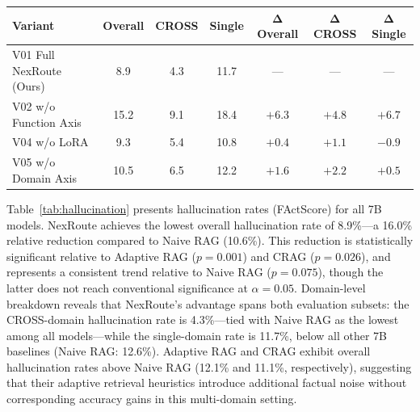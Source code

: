 \documentclass[a4paper,fleql]{cas-sc}
\begin{document}
\vspace{6pt plus 4pt minus 3pt}
\begin{center}
\begingroup
{}
\label{tab:ablation}
\begin{tabular}{lcccccc}
\toprule
\textbf{Variant} & \textbf{Overall} & \textbf{CROSS} & \textbf{Single} & $\boldsymbol{\Delta}$\textbf{Overall} & $\boldsymbol{\Delta}$\textbf{CROSS} & $\boldsymbol{\Delta}$\textbf{Single} \\
\midrule
V01 Full NexRoute (Ours) & 8.9 & 4.3 & 11.7 & --- & --- & --- \\
V02 w/o Function Axis    & 15.2 & 9.1 & 18.4 & $+6.3$ & $+4.8$ & $+6.7$ \\
V04 w/o LoRA        &  9.3 & 5.4 & 10.8 & $+0.4$ & $+1.1$ & $-0.9$ \\
V05 w/o Domain Axis & 10.5 & 6.5 & 12.2 & $+1.6$ & $+2.2$ & $+0.5$ \\
\midrule
\end{tabular}
\endgroup
\end{center}
\vspace{6pt plus 4pt minus 3pt}

Table~\ref{tab:hallucination} presents hallucination rates (FActScore) for all 7B models.
NexRoute achieves the lowest overall hallucination rate of 8.9\%---a 16.0\%
relative reduction compared to Naive RAG (10.6\%).
This reduction is statistically significant relative to Adaptive RAG
($p{=}0.001$) and CRAG ($p{=}0.026$), and represents a consistent trend
relative to Naive RAG ($p{=}0.075$), though the latter does not reach
conventional significance at $\alpha{=}0.05$.
Domain-level breakdown reveals that NexRoute's advantage spans both evaluation
subsets: the CROSS-domain hallucination rate is 4.3\%---tied with Naive RAG
as the lowest among all models---while the single-domain rate is 11.7\%,
below all other 7B baselines (Naive RAG: 12.6\%).
Adaptive RAG and CRAG exhibit overall hallucination rates above Naive RAG
(12.1\% and 11.1\%, respectively), suggesting that their adaptive retrieval
heuristics introduce additional factual noise without corresponding accuracy
gains in this multi-domain setting.
\end{document}
